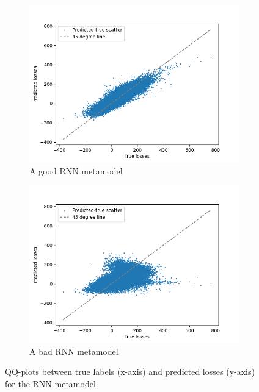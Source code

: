 \begin{figure}[ht!]
    \centering
    \begin{subfigure}{0.48\textwidth}
        \includegraphics[width=\textwidth]{./project2/figures/qqPlots/rnnGood.png}
        \caption{A good RNN metamodel}
    \end{subfigure}\hfill
    \begin{subfigure}{0.48\textwidth}
        \includegraphics[width=\textwidth]{./project2/figures/qqPlots/rnnBad.png}
        \caption{A bad RNN metamodel}
        \label{subfig2:badRNN}
    \end{subfigure}
    \caption{QQ-plots between true labels (x-axis) and predicted losses (y-axis) for the RNN metamodel.} 
    \label{fig2:QQ_RNN}
\end{figure}

